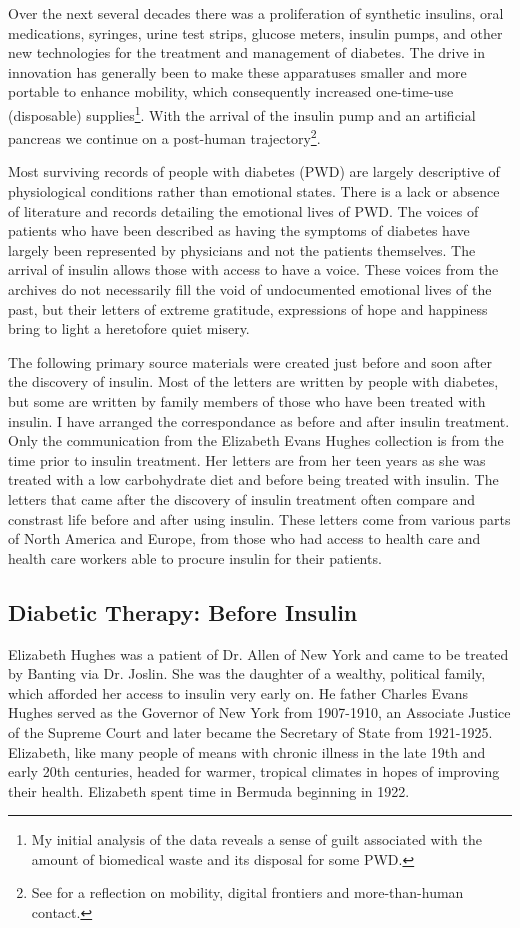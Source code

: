 \documentclass[12pt]{article}
\begin{document}
Over the next several decades there was a proliferation of synthetic insulins, oral medications, syringes, urine test strips, glucose meters, insulin pumps, and other new technologies \citep{phillip_attd_2012} for the treatment and management of diabetes. The drive in innovation has generally been to make these apparatuses smaller and more portable to enhance mobility, which consequently increased one-time-use (disposable) supplies\footnote{My initial analysis of the data reveals a sense of guilt associated with the amount of biomedical waste and its disposal for some PWD.}. With the arrival of the insulin pump and an artificial pancreas we continue on a post-human trajectory\footnote{See \citet{wilson_more_2011} for a reflection on mobility, digital frontiers and more-than-human contact.}.  


Most surviving records of people with diabetes (PWD) are largely descriptive of physiological conditions rather than emotional states. There is a lack or absence of literature and records detailing the emotional lives of PWD. The voices of patients who have been described as having the symptoms of diabetes have largely been represented by physicians and not the patients themselves.  The arrival of insulin allows those with access to have a voice. These voices from the archives do not necessarily fill the void of undocumented emotional lives of the past, but their letters of extreme gratitude, expressions of hope and happiness bring to light a heretofore quiet misery. 

The following primary source materials were created just before and soon after the discovery of insulin. Most of the letters are written by people with diabetes, but some are written by family members of those who have been treated with insulin. I have arranged the correspondance as before and after insulin treatment. 
Only the communication from the Elizabeth Evans Hughes collection is from the time prior to insulin treatment. Her letters are from her teen years as she was treated with a low carbohydrate diet and before being treated with insulin. The letters that came after the discovery of insulin treatment often compare and constrast life before and after using insulin. These letters come from various parts of North America and Europe, from those who had access to health care and health care workers able to procure insulin for their patients.  

\subsection{Diabetic Therapy: Before Insulin}
Elizabeth Hughes was a patient of Dr. Allen of New York and came to be treated by Banting via Dr. Joslin. She was the daughter of a wealthy, political family, which afforded her access to insulin very early on. He father Charles Evans Hughes served as the Governor of New York from 1907-1910, an Associate Justice of the Supreme Court and later became the Secretary of State from 1921-1925. Elizabeth, like many people of means with chronic illness in the late 19th and early 20th centuries, headed for warmer, tropical climates in hopes of improving their health. Elizabeth spent time in Bermuda beginning in 1922.
\end{document}
